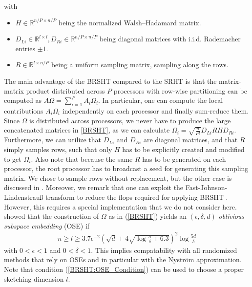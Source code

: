 \documentclass{article}
\theoremstyle{definition}
\begin{document}
with
\begin{itemize}
    \item $H\in \mathbb{R}^{n/P \times n/P}$ being the normalized Walsh–Hadamard
            matrix.
    \item $D_{L i}\in \mathbb{R}^{l \times l}, D_{R i}\in \mathbb{R}^{n/P \times
            n/P}$ being diagonal matrices with i.i.d. Rademacher entries $\pm
            1$.
    \item $R\in \mathbb{R}^{l \times n/P}$ being a  uniform sampling matrix,
            sampling along the rows.
\end{itemize}
The main advantage of the BRSHT compared to the SRHT is that the matrix-matrix
product distributed across $P$ processors with row-wise partitioning can be
computed as $A\Omega = \sum_{i=1}^P A_i \Omega_i$. In particular, one can
compute the local contributions $A_i \Omega_i$ independently on each processor
and finally sum-reduce them. Since $\Omega$ is distributed across processors, we
never have to produce the large concatenated matrices in \eqref{BRSHT}, as we
can calculate $\Omega_i=\sqrt{\frac{n}{Pl}} D_{Li} R H D_{Ri}$. Furthermore, we
can utilize that $D_{Li}$ and $D_{Ri}$ are diagonal matrices, and that $R$
simply samples rows, such that only $H$ has to be explicitly created and
modified to get $\Omega_i$. Also note that because the same $R$ has to be
generated on each processor, the root processor has to broadcast a seed for
generating this sampling matrix. We chose to sample rows without replacement,
but the other case is discussed in \cite{balabanov2022}. Moreover, we remark
that one can exploit the Fast-Johnson-Lindenstrauß transform to reduce the flops
required for applying BRSHT \cite{balabanov2022}. However, this requires a
special implementation that we do not consider here. \citeauthor{balabanov2022}
\cite{balabanov2022} showed that the construction of $\Omega$ as in
(\ref{BRSHT}) yields an $(\epsilon, \delta, d)$ \textit{oblivious subspace
embedding} (OSE) if
\begin{align}
    \label{BRSHT:OSE_Condition}
    n \geq l \geq 3.7 \epsilon^{-2}
    \left(
        \sqrt{d} + 4 \sqrt{\log \frac{n}{\delta} + 6.3}
    \right)^2
    \log \frac{5d}{\delta}
\end{align}
with $0 < \epsilon < 1$ and $0 < \delta < 1$. This implies compatability with
all randomized methods that rely on OSEs and in particular with the Nyström
approximation. Note that condition (\ref{BRSHT:OSE_Condition}) can be used to
choose a proper sketching dimension $l$.\newline
\end{document}
